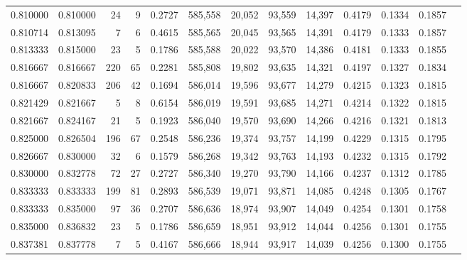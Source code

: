 \begin{tabular}{rrrrrrrrrrrrr}
0.810000 & 0.810000 &     24 &      9 &                                     0.2727 & 585,558 &  20,052 &  93,559 &  14,397 & 0.4179 & 0.1334 & 0.1857 \\
0.810714 & 0.813095 &      7 &      6 &                                     0.4615 & 585,565 &  20,045 &  93,565 &  14,391 & 0.4179 & 0.1333 & 0.1857 \\
0.813333 & 0.815000 &     23 &      5 &                                     0.1786 & 585,588 &  20,022 &  93,570 &  14,386 & 0.4181 & 0.1333 & 0.1855 \\
0.816667 & 0.816667 &    220 &     65 &                                     0.2281 & 585,808 &  19,802 &  93,635 &  14,321 & 0.4197 & 0.1327 & 0.1834 \\
0.816667 & 0.820833 &    206 &     42 &                                     0.1694 & 586,014 &  19,596 &  93,677 &  14,279 & 0.4215 & 0.1323 & 0.1815 \\
0.821429 & 0.821667 &      5 &      8 &                                     0.6154 & 586,019 &  19,591 &  93,685 &  14,271 & 0.4214 & 0.1322 & 0.1815 \\
0.821667 & 0.824167 &     21 &      5 &                                     0.1923 & 586,040 &  19,570 &  93,690 &  14,266 & 0.4216 & 0.1321 & 0.1813 \\
0.825000 & 0.826504 &    196 &     67 &                                     0.2548 & 586,236 &  19,374 &  93,757 &  14,199 & 0.4229 & 0.1315 & 0.1795 \\
0.826667 & 0.830000 &     32 &      6 &                                     0.1579 & 586,268 &  19,342 &  93,763 &  14,193 & 0.4232 & 0.1315 & 0.1792 \\
0.830000 & 0.832778 &     72 &     27 &                                     0.2727 & 586,340 &  19,270 &  93,790 &  14,166 & 0.4237 & 0.1312 & 0.1785 \\
0.833333 & 0.833333 &    199 &     81 &                                     0.2893 & 586,539 &  19,071 &  93,871 &  14,085 & 0.4248 & 0.1305 & 0.1767 \\
0.833333 & 0.835000 &     97 &     36 &                                     0.2707 & 586,636 &  18,974 &  93,907 &  14,049 & 0.4254 & 0.1301 & 0.1758 \\
0.835000 & 0.836832 &     23 &      5 &                                     0.1786 & 586,659 &  18,951 &  93,912 &  14,044 & 0.4256 & 0.1301 & 0.1755 \\
0.837381 & 0.837778 &      7 &      5 &                                     0.4167 & 586,666 &  18,944 &  93,917 &  14,039 & 0.4256 & 0.1300 & 0.1755 \\

\end{tabular}
